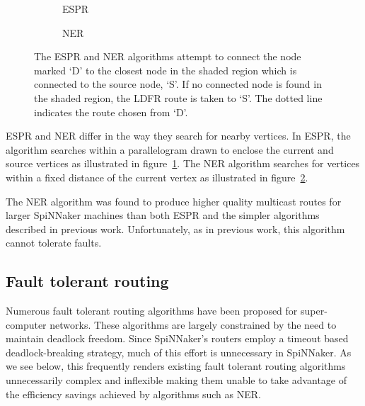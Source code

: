 			\begin{figure}
				\center
				\begin{subfigure}{0.45\linewidth}
					\center
					
					\caption{ESPR}
					\label{fig:search-regions-espr}
				\end{subfigure}
				\begin{subfigure}{0.45\linewidth}
					\center
					
					\caption{NER}
					\label{fig:search-regions-ner}
				\end{subfigure}
				
				\caption[The ESPR and NER multicast routing algorithms.]%
				{The ESPR and NER algorithms attempt to connect the node marked
				`D' to the closest node in the shaded region which is connected to the
				source node, `S'. If no connected node is found in the shaded region, the
				LDFR route is taken to `S'. The dotted line indicates the route chosen
				from `D'.}
				\label{fig:search-regions}
			\end{figure}
			
			ESPR and NER differ in the way they search for nearby vertices. In ESPR,
			the algorithm searches within a parallelogram drawn to enclose the
			current and source vertices as illustrated in
			figure~\ref{fig:search-regions-espr}. The NER algorithm searches for
			vertices within a fixed distance of the current vertex as illustrated in
			figure~\ref{fig:search-regions-ner}.
			
			The NER algorithm was found to produce higher quality multicast routes
			for larger SpiNNaker machines than both ESPR and the simpler algorithms
			described in previous work. Unfortunately, as in previous work, this
			algorithm cannot tolerate faults.
			
		\subsection{Fault tolerant routing}
			
			Numerous fault tolerant routing algorithms have been proposed for
			super-computer networks. These algorithms are largely constrained by the
			need to maintain deadlock freedom. Since SpiNNaker's routers employ a
			timeout based deadlock-breaking strategy, much of this effort is
			unnecessary in SpiNNaker. As we see below, this frequently renders
			existing fault tolerant routing algorithms unnecessarily complex and
			inflexible making them unable to take advantage of the efficiency savings
			achieved by algorithms such as NER.
			
